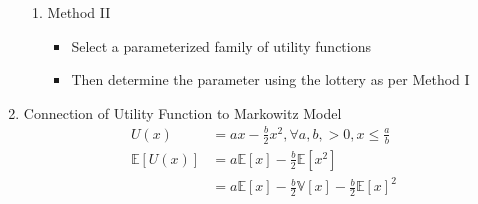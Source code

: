 \documentclass[12pt,twoside]{article}
\begin{document}
\begin{enumerate}
\begin{enumerate}
			\item Method II
				\begin{itemize}
					\item Select a parameterized family of utility functions
					\item Then determine the parameter using the lottery as per Method I
				\end{itemize}
		\end{enumerate}			

	\item Connection of Utility Function to Markowitz Model
		\begin{align*}
			U(x) 						& = ax -\frac{b}{2}x^2, \forall a,b,>0, x\leq \frac{a}{b}\\
			\mathbb{E} [U(x)] & = a\mathbb{E}[x] -\frac{b}{2} \mathbb{E}[x^2]\\
										& = a\mathbb{E}[x] -\frac{b}{2} \mathbb{V}[x] - \frac{b}{2} \mathbb{E}[x]^2
		\end{align*}

\end{enumerate}
\end{document}
